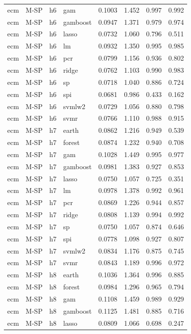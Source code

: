 \begin{ThreePartTable}
\begin{longtable}[t]{llclcccc}
ecm & M-SP & h6 & gam & 0.1003 & 1.452 & 0.997 & 0.992\\
ecm & M-SP & h6 & gamboost & 0.0947 & 1.371 & 0.979 & 0.974\\
ecm & M-SP & h6 & lasso & 0.0732 & 1.060 & 0.796 & 0.511\\
ecm & M-SP & h6 & lm & 0.0932 & 1.350 & 0.995 & 0.985\\
ecm & M-SP & h6 & pcr & 0.0799 & 1.156 & 0.936 & 0.802\\
ecm & M-SP & h6 & ridge & 0.0762 & 1.103 & 0.990 & 0.983\\
ecm & M-SP & h6 & sp & 0.0718 & 1.040 & 0.886 & 0.724\\
ecm & M-SP & h6 & spi & 0.0681 & 0.986 & 0.433 & 0.162\\
ecm & M-SP & h6 & svmlw2 & 0.0729 & 1.056 & 0.880 & 0.798\\
ecm & M-SP & h6 & svmr & 0.0766 & 1.110 & 0.988 & 0.915\\
\addlinespace
ecm & M-SP & h7 & earth & 0.0862 & 1.216 & 0.949 & 0.539\\
ecm & M-SP & h7 & forest & 0.0874 & 1.232 & 0.940 & 0.708\\
ecm & M-SP & h7 & gam & 0.1028 & 1.449 & 0.995 & 0.977\\
ecm & M-SP & h7 & gamboost & 0.0981 & 1.383 & 0.927 & 0.853\\
ecm & M-SP & h7 & lasso & 0.0750 & 1.057 & 0.725 & 0.351\\
ecm & M-SP & h7 & lm & 0.0978 & 1.378 & 0.992 & 0.961\\
ecm & M-SP & h7 & pcr & 0.0869 & 1.226 & 0.944 & 0.857\\
ecm & M-SP & h7 & ridge & 0.0808 & 1.139 & 0.994 & 0.992\\
ecm & M-SP & h7 & sp & 0.0750 & 1.057 & 0.874 & 0.646\\
ecm & M-SP & h7 & spi & 0.0778 & 1.098 & 0.927 & 0.807\\
ecm & M-SP & h7 & svmlw2 & 0.0834 & 1.176 & 0.875 & 0.745\\
ecm & M-SP & h7 & svmr & 0.0843 & 1.189 & 0.996 & 0.972\\
\addlinespace
ecm & M-SP & h8 & earth & 0.1036 & 1.364 & 0.996 & 0.885\\
ecm & M-SP & h8 & forest & 0.0984 & 1.296 & 0.965 & 0.794\\
ecm & M-SP & h8 & gam & 0.1108 & 1.459 & 0.989 & 0.929\\
ecm & M-SP & h8 & gamboost & 0.1125 & 1.481 & 0.885 & 0.716\\
ecm & M-SP & h8 & lasso & 0.0809 & 1.066 & 0.698 & 0.247\\

\end{longtable}
\end{ThreePartTable}
